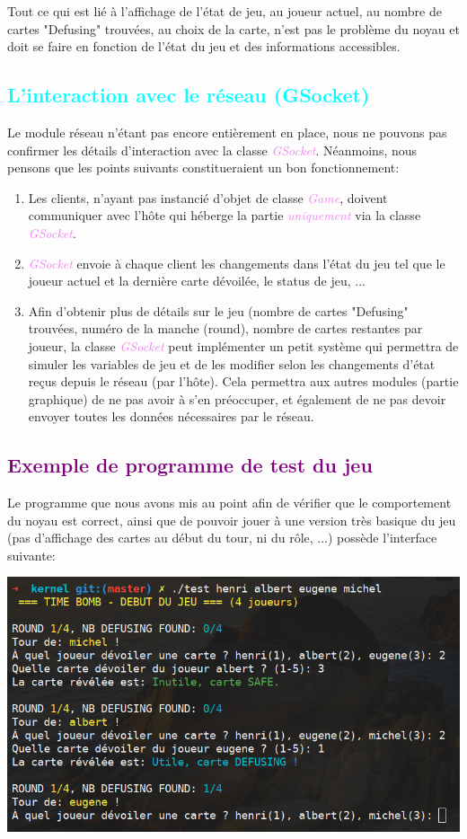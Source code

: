 \documentclass[a4paper]{article}
\let\oldsection\section
\renewcommand{\section}[1]{\textcolor{purple}{\oldsection{#1}}}
\let\oldsubsection\subsection
\renewcommand{\subsection}[1]{\textcolor{cyan}{\oldsubsection{#1}}}
\let\oldtextit\textit
\renewcommand{\textit}[1]{\textcolor{violet}{\oldtextit{#1}}}
\begin{document}
Tout ce qui est lié à l'affichage de l'état de jeu, au joueur actuel, au nombre de cartes "Defusing" trouvées, au choix de la carte, n'est pas le problème du noyau et doit se faire en fonction de l'état du jeu et des informations accessibles.

\subsection{L'interaction avec le réseau (GSocket)}

Le module réseau n'étant pas encore entièrement en place, nous ne pouvons pas confirmer les détails d'interaction avec la classe \textit{GSocket}. Néanmoins, nous pensons que les points suivants constitueraient un bon fonctionnement:
\begin{enumerate}
    \item Les clients, n'ayant pas instancié d'objet de classe \textit{Game}, doivent communiquer avec l'hôte qui héberge la partie \textit{uniquement} via la classe \textit{GSocket}.
    \item \textit{GSocket} envoie à chaque client les changements dans l'état du jeu tel que le joueur actuel et la dernière carte dévoilée, le status de jeu, ...
    \newpage
    \item Afin d'obtenir plus de détails sur le jeu (nombre de cartes "Defusing" trouvées, numéro de la manche (round), nombre de cartes restantes par joueur, la classe \textit{GSocket} peut implémenter un petit système qui permettra de simuler les variables de jeu et de les modifier selon les changements d'état reçus depuis le réseau (par l'hôte). Cela permettra aux autres modules (partie graphique) de ne pas avoir à s'en préoccuper, et également de ne pas devoir envoyer toutes les données nécessaires par le réseau.
\end{enumerate}

\section{Exemple de programme de test du jeu}

Le programme que nous avons mis au point afin de vérifier que le comportement du noyau est correct, ainsi que de pouvoir jouer à une version très basique du jeu (pas d'affichage des cartes au début du tour, ni du rôle, ...) possède l'interface suivante:

\begin{center}
    \includegraphics[scale=1.47]{img/test.png}
\end{center}
\end{document}
